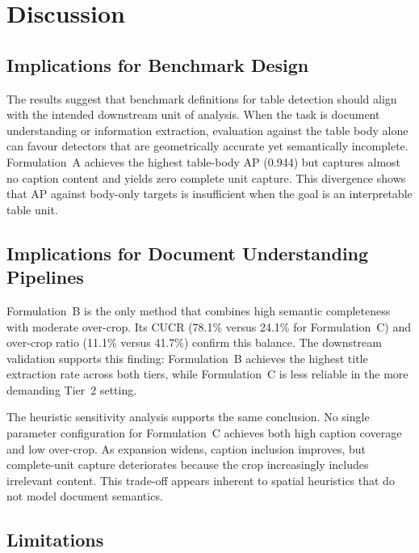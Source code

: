 \documentclass[pdflatex,sn-mathphys-num,iicol]{sn-jnl}
\begin{document}
\section{Discussion}\label{sec:discussion}

\subsection{Implications for Benchmark Design}\label{sec:benchmarks}

The results suggest that benchmark definitions for table detection should align with
the intended downstream unit of analysis. When the task is document understanding or
information extraction, evaluation against the table body alone can favour detectors
that are geometrically accurate yet semantically incomplete. Formulation~A achieves
the highest table-body AP (0.944) but captures almost no caption content and yields
zero complete unit capture. This divergence shows that AP against body-only targets
is insufficient when the goal is an interpretable table unit.

\subsection{Implications for Document Understanding Pipelines}\label{sec:pipelines}

Formulation~B is the only method that combines high semantic completeness with
moderate over-crop. Its CUCR (78.1\% versus 24.1\% for Formulation~C) and over-crop
ratio (11.1\% versus 41.7\%) confirm this balance. The downstream validation
supports this finding: Formulation~B achieves the highest title extraction rate
across both tiers, while Formulation~C is less reliable in the more demanding
Tier~2 setting.

The heuristic sensitivity analysis supports the same conclusion. No single
parameter configuration for Formulation~C achieves both high caption coverage and
low over-crop. As expansion widens, caption inclusion improves, but complete-unit
capture deteriorates because the crop increasingly includes irrelevant content.
This trade-off appears inherent to spatial heuristics that do not model document
semantics.

\subsection{Limitations}\label{sec:limitations}
\end{document}
